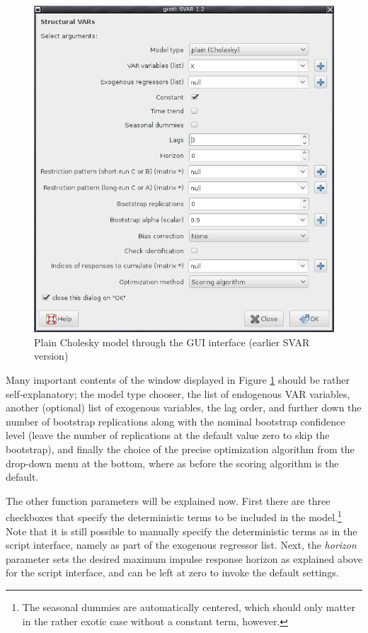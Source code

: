 \documentclass[a4paper,10pt]{article}
\newcounter{script}[section]
\begin{document}
\begin{figure}[htbp]
  \centering
  \includegraphics[scale=0.5]{GUI_SVAR.png}
  \caption{Plain Cholesky model through the GUI interface (earlier SVAR version)}
  \label{fig:GUI-plain}
\end{figure}


Many important contents of the window displayed in Figure
\ref{fig:GUI-plain} should be rather self-explanatory; the model type
chooser, the list of endogenous VAR variables, another (optional) list
of exogenous variables, the lag order, and further down the number of
bootstrap replications along with the nominal bootstrap confidence
level (leave the number of replications at the default value zero to
skip the bootstrap), and finally the choice of the precise
optimization algorithm from the drop-down menu at the bottom, where as
before the scoring algorithm is the default.

The other function parameters will be explained now. First there are
three checkboxes that specify the deterministic terms to be included
in the model.\footnote{The seasonal dummies are automatically
  centered, which should only matter in the rather exotic case without
  a constant term, however.} Note that it is still possible to
manually specify the deterministic terms as in the script interface,
namely as part of the exogenous regressor list. Next, the
\emph{horizon} parameter sets the desired maximum impulse response
horizon as explained above for the script interface, and can be left
at zero to invoke the default settings.
\end{document}
